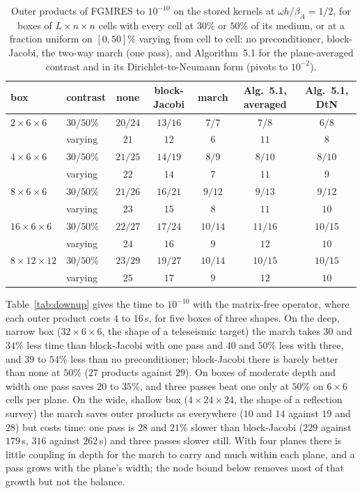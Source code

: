 \documentclass[11pt,a4paper]{article}
\begin{document}
\begin{table}[htbp]
\centering
\caption{Outer products of FGMRES to $10^{-10}$ on the stored kernels at $\omega h/\beta_A=1/2$, for boxes of
$L\times n\times n$ cells with every cell at $30\%$ or $50\%$ of its medium, or at a fraction uniform on
$[0,50]\%$ varying from cell to cell: no preconditioner, block-Jacobi, the two-way march (one pass), and
Algorithm~5.1 for the plane-averaged contrast and in its Dirichlet-to-Neumann form (pivots to $10^{-2}$).}
\label{tab:dtn}
\begin{tabular}{llccccc}
\toprule
box & contrast & none & block-Jacobi & march & Alg.~5.1, averaged & Alg.~5.1, DtN \\
\midrule
$2\times6\times6$ & $30/50\%$ & $20/24$ & $13/16$ & $7/7$ & $7/8$ & $6/8$ \\
 & varying & $21$ & $12$ & $6$ & $11$ & $8$ \\
$4\times6\times6$ & $30/50\%$ & $21/25$ & $14/19$ & $8/9$ & $8/10$ & $8/10$ \\
 & varying & $22$ & $14$ & $7$ & $11$ & $9$ \\
$8\times6\times6$ & $30/50\%$ & $21/26$ & $16/21$ & $9/12$ & $9/13$ & $9/12$ \\
 & varying & $23$ & $15$ & $8$ & $11$ & $10$ \\
$16\times6\times6$ & $30/50\%$ & $22/27$ & $17/24$ & $10/14$ & $11/16$ & $10/15$ \\
 & varying & $24$ & $16$ & $9$ & $12$ & $10$ \\
$8\times12\times12$ & $30/50\%$ & $23/29$ & $19/27$ & $10/14$ & $10/15$ & $10/15$ \\
 & varying & $25$ & $17$ & $9$ & $12$ & $10$ \\
\bottomrule
\end{tabular}
\end{table}

Table~\ref{tab:downup} gives the time to $10^{-10}$ with the matrix-free operator, where each outer product costs
$4$ to $16$\,s, for five boxes of three shapes. On the deep, narrow box ($32\times6\times6$, the shape of a
teleseismic target) the march takes $30$ and $34\%$ less time than block-Jacobi with one pass and $40$ and $50\%$ less with
three, and $39$ to $54\%$ less than no preconditioner; block-Jacobi there is barely better than none at $50\%$
($27$ products against $29$). On boxes of moderate depth and width one pass saves $20$ to $35\%$, and three passes
beat one only at $50\%$ on $6\times6$ cells per plane. On the wide, shallow box ($4\times24\times24$, the shape of a reflection survey) the march
saves outer products as everywhere ($10$ and $14$ against $19$ and $28$) but costs time: one pass is $28$ and $21\%$
slower than block-Jacobi ($229$ against $179$\,s, $316$ against $262$\,s) and three passes slower still. With four planes there is
little coupling in depth for the march to carry and much within each plane, and a pass grows with the plane's
width; the node bound below removes most of that growth but not the balance.
\end{document}
